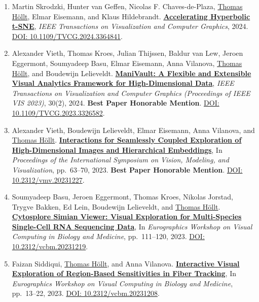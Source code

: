 \documentclass[10pt,a4paper,roman,final]{moderncv}
\newcommand*\highlightauthor[1]{\underline{#1}}
\begin{document}
\begin{enumerate}[leftmargin=0cm,start=2]
\item
Martin Skrodzki, Hunter van Geffen, Nicolas F. Chaves-de-Plaza, \highlightauthor{Thomas Höllt}, Elmar Eisemann, and Klaus Hildebrandt.
\href{https://www.thomashollt.com/publications/2024_hyperbolic/}{\textbf{Accelerating Hyperbolic t-SNE}},
\emph{IEEE Transactions on Visualization and Computer Graphics},
2024.
\href{https://doi.org/10.1109/TVCG.2024.3364841}{DOI: 10.1109/\allowbreak TVCG.2024.3364841}.


\item
Alexander Vieth, Thomas Kroes, Julian Thijssen, Baldur van Lew, Jeroen Eggermont, Soumyadeep Basu, Elmar Eisemann, Anna Vilanova, \highlightauthor{Thomas Höllt}, and Boudewijn Lelieveldt.
\href{https://www.thomashollt.com/publications/2023_vis/}{\textbf{ManiVault: A Flexible and Extensible Visual Analytics Framework for High-Dimensional Data}},
\emph{IEEE Transactions on Visualization and Computer Graphics (Proceedings of IEEE VIS 2023)}, 30(2),
2024.
\textbf{Best Paper Honorable Mention}.
\href{https://doi.org/10.1109/TVCG.2023.3326582}{DOI: 10.1109/\allowbreak TVCG.2023.3326582}.


\item
Alexander Vieth, Boudewijn Lelieveldt, Elmar Eisemann, Anna Vilanova, and \highlightauthor{Thomas Höllt}.
\href{https://www.thomashollt.com/publications/2023_vmv/}{\textbf{Interactions for Seamlessly Coupled Exploration of High-Dimensional Images and Hierarchical Embeddings}},
In \emph{Proceedings of the International Symposium on Vision, Modeling, and Visualization}, pp.~63--70,
2023.
\textbf{Best Paper Honorable Mention}.
\href{https://doi.org/10.2312/vmv.20231227}{DOI: 10.2312/\allowbreak vmv.20231227}.


\item
Soumyadeep Basu, Jeroen Eggermont, Thomas Kroes, Nikolas Jorstad, Trygve Bakken, Ed Lein, Boudewijn Lelieveldt, and \highlightauthor{Thomas Höllt}.
\href{https://www.thomashollt.com/publications/2023_vcbm_soumyadeep/}{\textbf{Cytosplore Simian Viewer: Visual Exploration for Multi-Species Single-Cell RNA Sequencing Data}},
In \emph{Eurographics Workshop on Visual Computing in Biology and Medicine}, pp.~111--120,
2023.
\href{https://doi.org/10.2312/vcbm.20231219}{DOI: 10.2312/\allowbreak vcbm.20231219}.


\item
Faizan Siddiqui, \highlightauthor{Thomas Höllt}, and Anna Vilanova.
\href{https://www.thomashollt.com/publications/2023_vcbm_faizan/}{\textbf{Interactive Visual Exploration of Region-Based Sensitivities in Fiber Tracking}},
In \emph{Eurographics Workshop on Visual Computing in Biology and Medicine}, pp.~13--22,
2023.
\href{https://doi.org/10.2312/vcbm.20231208}{DOI: 10.2312/\allowbreak vcbm.20231208}.



\end{enumerate}
\end{document}
